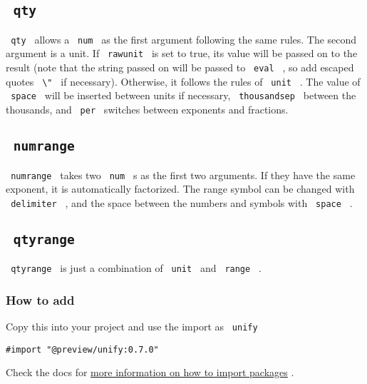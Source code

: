 \subsection{\texorpdfstring{\texttt{\ qty\ }}{ qty }}\label{qty}

\texttt{\ qty\ } allows a \texttt{\ num\ } as the first argument
following the same rules. The second argument is a unit. If
\texttt{\ rawunit\ } is set to true, its value will be passed on to the
result (note that the string passed on will be passed to
\texttt{\ eval\ } , so add escaped quotes \texttt{\ \textbackslash{}"\ }
if necessary). Otherwise, it follows the rules of \texttt{\ unit\ } .
The value of \texttt{\ space\ } will be inserted between units if
necessary, \texttt{\ thousandsep\ } between the thousands, and
\texttt{\ per\ } switches between exponents and fractions.

\subsection{\texorpdfstring{\texttt{\ numrange\ }}{ numrange }}\label{numrange}

\texttt{\ numrange\ } takes two \texttt{\ num\ } s as the first two
arguments. If they have the same exponent, it is automatically
factorized. The range symbol can be changed with \texttt{\ delimiter\ }
, and the space between the numbers and symbols with \texttt{\ space\ }
.

\subsection{\texorpdfstring{\texttt{\ qtyrange\ }}{ qtyrange }}\label{qtyrange}

\texttt{\ qtyrange\ } is just a combination of \texttt{\ unit\ } and
\texttt{\ range\ } .

\subsubsection{How to add}\label{how-to-add}

Copy this into your project and use the import as \texttt{\ unify\ }

\begin{verbatim}
#import "@preview/unify:0.7.0"
\end{verbatim}



Check the docs for
\href{https://typst.app/docs/reference/scripting/\#packages}{more
information on how to import packages} .

